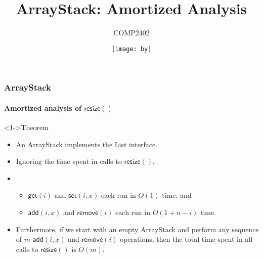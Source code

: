 \documentclass[aspectratio=169,xcolor=dvipsnames]{beamer}
\title{ArrayStack: Amortized Analysis}
\author{COMP2402}
\date{\texttt{[image: by]}}
\begin{document}
\begin{frame}
  \titlepage
\end{frame}

\begin{frame}
  \frametitle{ArrayStack}
  \framesubtitle{Amortized analysis of $\mathsf{resize}()$}
  \begin{block}<1->{Theorem}
    \begin{itemize}
      \item[]An ArrayStack implements the List interface.
      \item<1-| alert@2>[]Ignoring the time spent in calls to $\mathsf{resize}()$,
      \item[]
      \begin{itemize}
          \item$\mathsf{get}(i)$ and $\mathsf{set}(i,x)$ each run in $O(1)$ time; and
          \item$\mathsf{add}(i,x)$ and $\mathsf{remove}(i)$ each run in $O(1+n-i)$ time.
      \end{itemize}
      \item<3->[]Furthermore, if we start with an empty ArrayStack and perform any sequence of $m$ $\mathsf{add}(i,x)$ and $\mathsf{remove}(i)$ operations, then the total time spent in all calls to $\mathsf{resize}()$ is $O(m)$.
    \end{itemize}
  \end{block}
\end{frame}


\newlength{\nwidth}
\setlength{\fboxsep}{0pt}
\setlength{\nwidth}{.25\textwidth}
\end{document}

